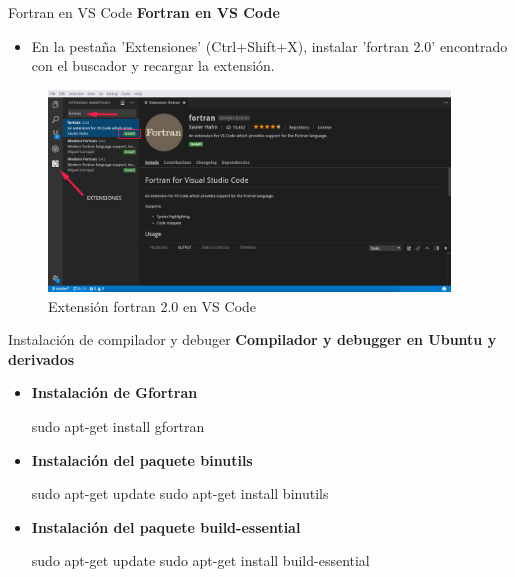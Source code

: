 \begin{frame}[fragile]{Fortran en VS Code}
 \textbf{Fortran en VS Code}
  \begin{itemize}
   \item  En la pestaña 'Extensiones' (Ctrl+Shift+X), instalar 'fortran 2.0' encontrado con el buscador y recargar la extensión. 
  \end{itemize}
   \begin{figure}
    \includegraphics[width=0.95\textwidth]{./resources/vscodefortran.png}
    \caption{Extensión fortran 2.0 en VS Code}
   \end{figure}
\end{frame}

\begin{frame}[fragile]{Instalación de compilador y debuger}
  \textbf{Compilador y debugger en Ubuntu y derivados}
\begin{itemize}[<+(1)->] 
\item \textbf{Instalación de Gfortran}
    \begin{mintedbash} 
       sudo apt-get install gfortran
    \end{mintedbash}
  \item	\textbf{Instalación del paquete binutils}
    \begin{mintedbash}
       sudo apt-get update
       sudo apt-get install binutils
    \end{mintedbash}
\item	\textbf{Instalación del paquete build-essential}
    \begin{mintedbash}
       sudo apt-get update
       sudo apt-get install build-essential
  	\end{mintedbash}
\end{itemize}
\end{frame}


